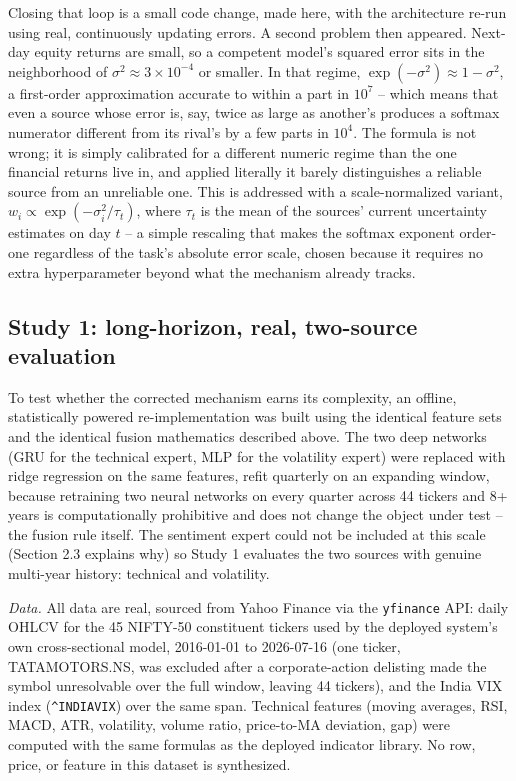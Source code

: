 \documentclass[10pt,a4paper,twocolumn]{article}
\begin{document}
Closing that loop is a small code change, made here, with the architecture re-run using real, continuously updating errors. A second problem then appeared. Next-day equity returns are small, so a competent model's squared error sits in the neighborhood of $\sigma^2 \approx 3\times 10^{-4}$ or smaller. In that regime, $\exp(-\sigma^2) \approx 1 - \sigma^2$, a first-order approximation accurate to within a part in $10^{7}$ -- which means that even a source whose error is, say, twice as large as another's produces a softmax numerator different from its rival's by a few parts in $10^4$. The formula is not wrong; it is simply calibrated for a different numeric regime than the one financial returns live in, and applied literally it barely distinguishes a reliable source from an unreliable one. This is addressed with a scale-normalized variant, $w_i \propto \exp(-\sigma_i^2/\tau_t)$, where $\tau_t$ is the mean of the sources' current uncertainty estimates on day $t$ -- a simple rescaling that makes the softmax exponent order-one regardless of the task's absolute error scale, chosen because it requires no extra hyperparameter beyond what the mechanism already tracks.

\subsection{Study 1: long-horizon, real, two-source evaluation}

To test whether the corrected mechanism earns its complexity, an offline, statistically powered re-implementation was built using the identical feature sets and the identical fusion mathematics described above. The two deep networks (GRU for the technical expert, MLP for the volatility expert) were replaced with ridge regression on the same features, refit quarterly on an expanding window, because retraining two neural networks on every quarter across 44 tickers and 8+ years is computationally prohibitive and does not change the object under test -- the fusion rule itself. The sentiment expert could not be included at this scale (Section 2.3 explains why) so Study 1 evaluates the two sources with genuine multi-year history: technical and volatility.

\textit{Data.} All data are real, sourced from Yahoo Finance via the \texttt{yfinance} API: daily OHLCV for the 45 NIFTY-50 constituent tickers used by the deployed system's own cross-sectional model, 2016-01-01 to 2026-07-16 (one ticker, TATAMOTORS.NS, was excluded after a corporate-action delisting made the symbol unresolvable over the full window, leaving 44 tickers), and the India VIX index (\texttt{\^{}INDIAVIX}) over the same span. Technical features (moving averages, RSI, MACD, ATR, volatility, volume ratio, price-to-MA deviation, gap) were computed with the same formulas as the deployed indicator library. No row, price, or feature in this dataset is synthesized.
\end{document}
